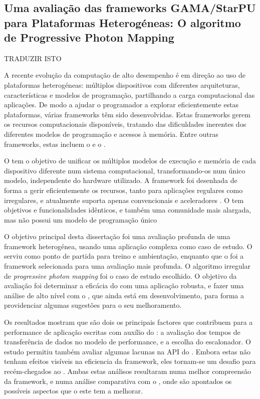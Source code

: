 \documentclass[main.tex]{subfiles}
\begin{document}
\cleardoublepage
{}
{}
\chapter*{\abstractname}
  \section*{Uma avaliação das frameworks GAMA/StarPU para Plataformas Heterogéneas: O algoritmo de Progressive Photon Mapping}

  TRADUZIR ISTO

  A recente evolução da computação de alto desempenho é em direção ao uso de plataformas heterogéneas: múltiplos dispositivos com diferentes arquiteturas, características e modelos de programação, partilhando a carga computacional das aplicações. De modo a ajudar o programador a explorar eficientemente estas plataformas, várias frameworks têm sido desenvolvidas. Estas frameworks gerem os recursos computacionais disponíveis, tratando das dificuldades inerentes dos diferentes modelos de programação e acessos à memória. Entre outras frameworks, estas incluem o \gama e o \starpu.

  O \gama tem o objetivo de unificar os múltiplos modelos de execução e memória de cada dispositivo diferente num sistema computacional, transformando-os num único modelo, independente do hardware utilizado. A framework foi desenhada de forma a gerir eficientemente os recursos, tanto para aplicações regulares como irregulares, e atualmente suporta apenas \cpus convencionais e aceleradores \cuda. O \starpu tem objetivos e funcionalidades idênticos, e também uma comunidade mais alargada, mas não possui um modelo de programação único

  O objetivo principal desta dissertação foi uma avaliação profunda de uma framework heterogénea, usando uma aplicação complexa como caso de estudo. O \gama serviu como ponto de partida para treino e ambientação, enquanto que o \starpu foi a framework selecionada para uma avaliação mais profunda. O algoritmo irregular de \textit{progressive photon mapping} foi o caso de estudo escolhido. O objetivo da avaliação foi determinar a eficácia do \starpu com uma aplicação robusta, e fazer uma análise de alto nível com o \gama, que ainda está em desenvolvimento, para forma a providenciar algumas sugestões para o seu melhoramento.

  Os resultados mostram que são dois os principais factores que contribuem para a performance de aplicação escritas com auxílio do \starpu: a avaliação dos tempos de transferência de dados no modelo de performance, e a escolha do escalonador. O estudo permitiu também avaliar algumas lacunas na API do \starpu. Embora estas não tenham efeitos visíveis na eficiencia da framework, eles tornam-se um desafio para recém-chegados ao \starpu. Ambas estas análisos resultaram numa melhor compreensão da framework, e numa análise comparativa com o \gama, onde são apontados os possíveis aspectos que o este tem a melhorar.
\end{document}
